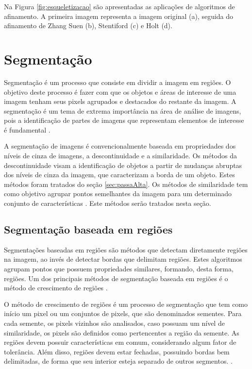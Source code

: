 \documentclass[
	12pt,				%
	oneside,			%
	a4paper,			%
	english,			%
	french,				%
	spanish,			%
	brazil,				%
	]{abntex2}
\begin{document}
Na Figura \ref{fig:esqueletizacao} são apresentadas as aplicações de algoritmos de afinamento. A primeira imagem representa a imagem original (a), seguida do afinamento de Zhang Suen (b), Stentiford (c) e Holt (d). 
   
\section{Segmentação}  

Segmentação é um processo que consiste em dividir a imagem em regiões. O objetivo deste processo é fazer com que os objetos e áreas de interesse de uma imagem tenham seus pixels agrupados e destacados do restante da imagem. A segmentação é um tema de extrema importância na área de análise de imagens, pois a identificação de partes de imagens que representam elementos de interesse é fundamental \cite{conciAzevedoLeta:2008}.  

A segmentação de imagens é convencionalmente baseada em propriedades dos níveis de cinza de imagens, a descontinuidade e a similaridade. Os métodos da descontinuidade visam a identificação de objetos a partir de mudanças abruptas dos níveis de cinza da imagem, que caracterizam a borda de um objeto. Estes métodos foram tratados do seção \ref{sec:passaAlta}. Os métodos de similaridade tem como objetivo agrupar pontos semelhantes da imagem para um determinado conjunto de características \cite{pedriniSchwartz:2008}. Este métodos serão tratados nesta seção.
    
\subsection{Segmentação baseada em regiões}     

Segmentações baseadas em regiões são métodos que detectam diretamente regiões na imagem, ao invés de detectar bordas que delimitam regiões. Estes algoritmos agrupam pontos que possuem propriedades similares, formando, desta forma, regiões. Um dos principais métodos de segmentação baseada em regiões é o método de crescimento de regiões \cite{pedriniSchwartz:2008}.

O método de crescimento de regiões é um processo de segmentação que tem como início um pixel ou um conjuntos de pixels, que são denominados sementes. Para cada semente, os pixels vizinhos são analisados, caso possuam um nível de similaridade, os pixels são definidos como pertencentes a região da semente. As regiões devem possuir características em comum, considerando algum fator de tolerância. Além disso, regiões devem estar fechadas, possuindo bordas bem delimitadas, de forma que seu interior esteja separado de outros segmentos. \cite{conciAzevedoLeta:2008}.
\end{document}
